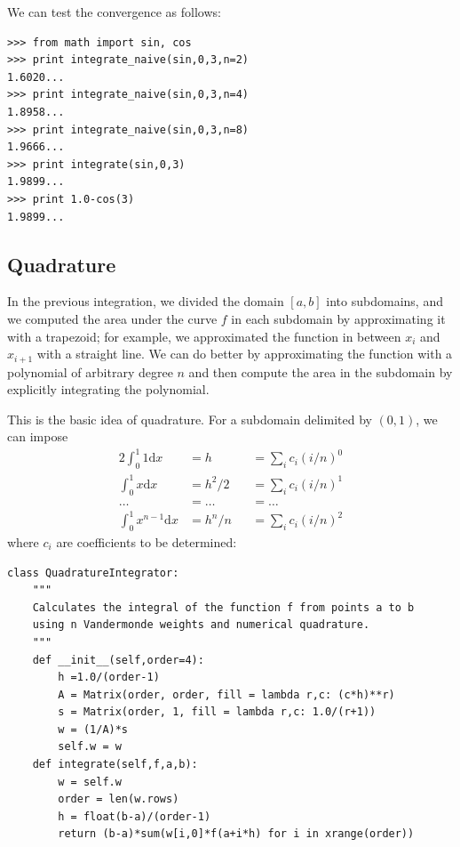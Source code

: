 \documentclass[justified,sixbynine]{tufte-book}
\def\ft{\small\tt}
\theoremstyle{plain}%
\theoremstyle{definition}
\theoremstyle{remark}
\begin{document}
\begin{fullwidth}
We can test the convergence as follows:

\begin{lstlisting}[caption={in file: {\ft nlib.py}}]
>>> from math import sin, cos
>>> print integrate_naive(sin,0,3,n=2)
1.6020...
>>> print integrate_naive(sin,0,3,n=4)
1.8958...
>>> print integrate_naive(sin,0,3,n=8)
1.9666...
>>> print integrate(sin,0,3)
1.9899...
>>> print 1.0-cos(3)
1.9899...
\end{lstlisting}

\goodbreak\subsection{Quadrature}


In the previous integration, we divided the domain $[a,b]$ into subdomains, and we computed the area under the curve $f$ in each subdomain by approximating it with a trapezoid; for example, we approximated the function in between $x_i$ and $x_{i+1}$ with a straight line. We can do better by approximating the function with a polynomial of arbitrary degree $n$ and then compute the area in the subdomain by explicitly integrating the polynomial.

This is the basic idea of quadrature. For a subdomain delimited by $(0,1)$, we can impose
\begin{alignat}{2}
\int_0^1 1\textrm{d}x &= h &&= \sum_i c_i (i/n)^0 \\
\int_0^1 x\textrm{d}x &= h^2/2 &&= \sum_i c_i (i/n)^1 \\
\dots &= \dots &&= \dots \\
\int_0^1 x^{n-1}\textrm{d}x &= h^n/n &&= \sum_i c_i (i/n)^2
\end{alignat}
where $c_i$ are coefficients to be determined:


\begin{lstlisting}[caption={in file: {\ft nlib.py}}]
class QuadratureIntegrator:
    """
    Calculates the integral of the function f from points a to b
    using n Vandermonde weights and numerical quadrature.
    """
    def __init__(self,order=4):
        h =1.0/(order-1)
        A = Matrix(order, order, fill = lambda r,c: (c*h)**r)
        s = Matrix(order, 1, fill = lambda r,c: 1.0/(r+1))
        w = (1/A)*s
        self.w = w
    def integrate(self,f,a,b):
        w = self.w
        order = len(w.rows)
        h = float(b-a)/(order-1)
        return (b-a)*sum(w[i,0]*f(a+i*h) for i in xrange(order))


\end{lstlisting}
\end{fullwidth}
\end{document}
